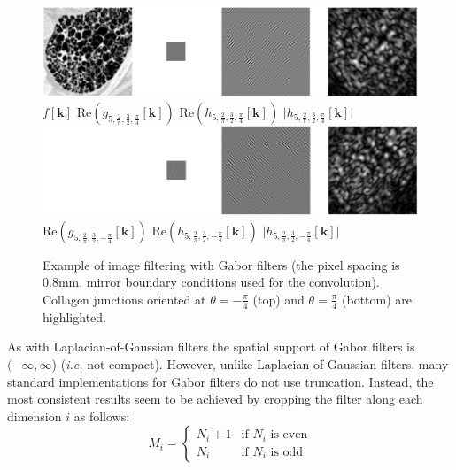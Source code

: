 \documentclass[fleqn,a4paper,oneside,openany]{book}
\begin{document}
\begin{figure}
\centering
\includegraphics[trim = 0 0 0 0, clip, width=\linewidth]{Gabor_example.png}\\
\hspace{.5cm}
$f[\boldsymbol{k}]$
\hspace{1.6cm}
$\text{Re}\left(g_{5,\frac{2}{\pi},\frac{3}{2},\frac{\pi}{4}}[\boldsymbol{k}]\right)$
\hspace{.8cm}
$\text{Re}\left(h_{5,\frac{2}{\pi},\frac{3}{2},\frac{\pi}{4}}[\boldsymbol{k}]\right)$
\hspace{1.6cm}
$\lvert h_{5,\frac{2}{\pi},\frac{3}{2},\frac{\pi}{4}}[\boldsymbol{k}]\rvert$\\
\vspace{.3cm}
\includegraphics[trim = 0 0 0 0, clip, width=\linewidth]{Gabor_example2.png}\\
\hspace{.5cm}
\phantom{$f[\boldsymbol{k}]$}
\hspace{1.6cm}
$\text{Re}\left(g_{5,\frac{2}{\pi},\frac{3}{2},-\frac{\pi}{4}}[\boldsymbol{k}]\right)$
\hspace{.7cm}
$\text{Re}\left(h_{5,\frac{2}{\pi},\frac{3}{2},-\frac{\pi}{4}}[\boldsymbol{k}]\right)$
\hspace{1.5cm}
$\lvert h_{5,\frac{2}{\pi},\frac{3}{2},-\frac{\pi}{4}}[\boldsymbol{k}]\rvert$
\caption{Example of image filtering with Gabor filters (the pixel spacing is 0.8mm, mirror boundary conditions used for the convolution).
Collagen junctions oriented at $\theta=-\frac{\pi}{4}$ (top) and $\theta=\frac{\pi}{4}$ (bottom) are highlighted.
}
  \label{fig:Gabor_example}
\end{figure}
%

As with Laplacian-of-Gaussian filters the spatial support of Gabor filters is \((-\infty, \infty\)) (\emph{i.e.} not compact). However, unlike Laplacian-of-Gaussian filters, many standard implementations for Gabor filters do not use truncation. Instead, the most consistent results seem to be achieved by cropping the filter along each dimension $i$ as follows:
\begin{equation}\label{eq:gaborFilterSupport}
M_i= 
\begin{cases}
N_i + 1 & \text{if } N_i \text{ is even}\\
N_i & \text{if } N_i \text{ is odd}
\end{cases}
\end{equation}
%
\end{document}
